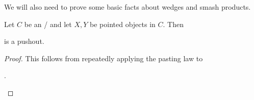 We will also need to prove some basic facts about wedges and smash products.
\begin{lemma}\label{lem:poOfCollapseMapsIsTrivial}
    Let $C$ be an \inftytop/ and let $X,Y$ be pointed objects in $C$. 
    Then 
    \begin{center}
    \end{center}
    is a pushout.
    \begin{proof}
        This follows from repeatedly applying the pasting law to 
        \begin{center}
            \;.
        \end{center}
    \end{proof}
\end{lemma}
